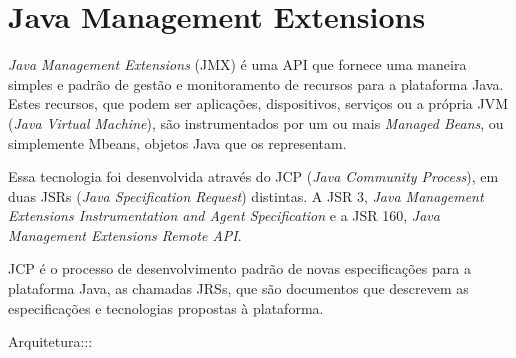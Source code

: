 \chapter{Java Management Extensions}
\label{ch:4}
\textit{Java Management Extensions} (JMX) é uma API que fornece uma maneira simples e padrão de gestão e monitoramento de recursos para a plataforma Java. Estes recursos, que podem ser aplicações, dispositivos, serviços ou a própria JVM (\textit{Java Virtual Machine}), são instrumentados por um ou mais \textit{Managed Beans}, ou simplemente Mbeans, objetos Java que os representam.

Essa tecnologia foi desenvolvida através do JCP (\textit{Java Community Process}), em duas JSRs (\textit{Java Specification Request}) distintas. A JSR 3, \textit{Java Management Extensions Instrumentation and Agent Specification} e a JSR 160, \textit{Java Management Extensions Remote API}.

JCP é o processo de desenvolvimento padrão de novas especificações para a plataforma Java, as chamadas JRSs, que são documentos que descrevem as especificações e tecnologias propostas à plataforma.

Arquitetura:::